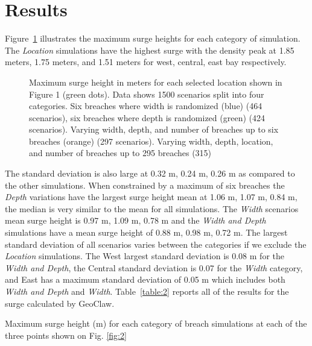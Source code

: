 \documentclass{coastal_paper}
\begin{document}
\section{Results}
 Figure~\ref{fig:3} illustrates the maximum surge heights for each category of simulation. The \emph{Location} simulations have the highest surge with the density peak at 1.85 meters, 1.75 meters, and 1.51 meters for west, central, east bay respectively. 

\begin{figure}[ht]
    \centering
    \resizebox{\textwidth}{!}{%
            
        }
    \caption{Maximum surge height in meters for each selected location shown in Figure 1 (green dots). Data shows 1500 scenarios split into four categories. Six breaches where width is randomized (blue) (464 scenarios), six breaches where depth is randomized (green) (424 scenarios). Varying width, depth, and number of breaches up to six breaches (orange) (297 scenarios). Varying width, depth, location, and number of breaches up to 295 breaches (315)}
    \label{fig:3}
\end{figure}

The standard deviation is also large at 0.32 m, 0.24 m, 0.26 m as compared to the other simulations. When constrained by a maximum of six breaches the \emph{Depth} variations have the largest surge height mean at 1.06 m, 1.07 m, 0.84 m, the median is very similar to the mean for all simulations. The \emph{Width} scenarios mean surge height is 0.97 m, 1.09 m, 0.78 m and the \emph{Width and Depth} simulations have a mean surge height of 0.88 m, 0.98 m, 0.72 m.
 The largest standard deviation of all scenarios varies between the categories if we exclude the \emph{Location} simulations. The West largest standard deviation is 0.08 m for the \emph{Width and Depth}, the Central standard deviation is 0.07 for the \emph{Width} category, and East has a maximum standard deviation of 0.05 m which includes both \emph{Width and Depth} and \emph{Width}. Table~\ref{table:2} reports all of the results for the surge calculated by GeoClaw.
 
\begin{table}[ht]
    \begin{adjustbox}{width=0.9\textwidth} %
    
    \end{adjustbox}
    \caption{Maximum surge height (m) for each category of breach simulations at each of the three points shown on Fig. \ref{fig:2}}
    \label{table:2}
\end{table}
\end{document}

